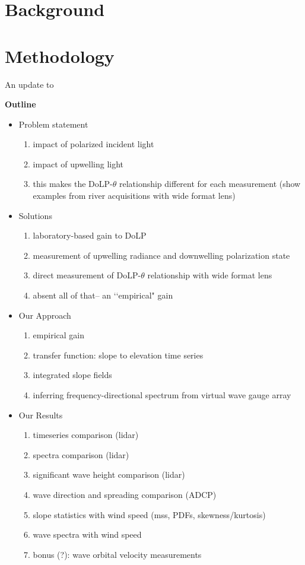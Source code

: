 \documentclass[letterpaper,journal]{IEEEtran}
\begin{document}
\newpage

\section{Background}

\section{Methodology}

An update to \cite{Zappa2008}

\textbf{Outline}

\begin{itemize}
    \item Problem statement
    \begin{enumerate}
        \item impact of polarized incident light
        \item impact of upwelling light
        \item this makes the DoLP-$\theta$ relationship different for each measurement (show examples from river acquisitions with wide format lens)
    \end{enumerate}
    \item Solutions
    \begin{enumerate}
        \item laboratory-based gain to DoLP
        \item measurement of upwelling radiance and downwelling polarization state
        \item direct measurement of DoLP-$\theta$ relationship with wide format lens
        \item absent all of that-- an \lq\lq empirical" gain
    \end{enumerate}
    \item Our Approach
    \begin{enumerate}
        \item empirical gain
        \item transfer function: slope to elevation time series
        \item integrated slope fields
        \item inferring frequency-directional spectrum from virtual wave gauge array
    \end{enumerate}
    \item Our Results
    \begin{enumerate}
        \item timeseries comparison (lidar)
        \item spectra comparison (lidar)
        \item significant wave height comparison (lidar)
        \item wave direction and spreading comparison (ADCP)
        \item slope statistics with wind speed (mss, PDFs, skewness/kurtosis)
        \item wave spectra with wind speed
        \item bonus (?): wave orbital velocity measurements
    \end{enumerate}
\end{itemize}
\end{document}
